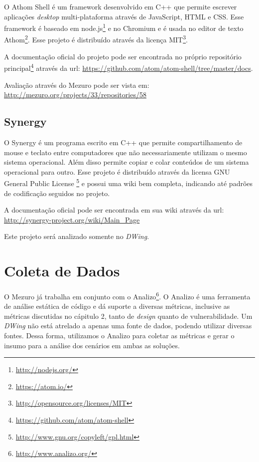 O Athom Shell é um framework desenvolvido em C++ que permite escrever aplicações \emph{desktop} multi-plataforma através de JavaScript, HTML e CSS. Esse framework é baseado em node.js\footnote{\url{http://nodejs.org/}} e no Chromium e é usada no editor de texto Athom\footnote{\url{https://atom.io/}}. Esse projeto é distribuído através da licença MIT\footnote{\url{http://opensource.org/licenses/MIT}}.

A documentação oficial do projeto pode ser encontrada no próprio repositório principal\footnote{\url{https://github.com/atom/atom-shell}} através da url: \url{https://github.com/atom/atom-shell/tree/master/docs}.

Avaliação através do Mezuro pode ser vista em: \url{http://mezuro.org/projects/33/repositories/58}

\subsection{Synergy}
\label{section-synergy}

O Synergy é um programa escrito em C++ que permite compartilhamento de mouse e teclato entre computadores que não necessariamente utilizam o mesmo sistema operacional. Além disso permite copiar e colar conteúdos de um sistema operacional para outro. Esse projeto é distribuído através da licensa GNU General Public License \footnote{\url{http://www.gnu.org/copyleft/gpl.html}} e possui uma wiki bem completa, indicando até padrões de codificação seguidos no projeto.

A documentação oficial pode ser encontrada em sua wiki através da url: \url{http://synergy-project.org/wiki/Main_Page}

Este projeto será analizado somente no \emph{DWing}.

\section{Coleta de Dados}
\label{data-colect}

O Mezuro já trabalha em conjunto com o Analizo\footnote{\url{http://www.analizo.org/}}. O Analizo é uma ferramenta de análise estática de código e dá suporte a diversas métricas, inclusive as métricas discutidas no cápitulo 2, tanto de \emph{design} quanto de vulnerabilidade. Um \emph{DWing} não está atrelado a apenas uma fonte de dados, podendo utilizar diversas fontes. Dessa forma, utilizamos o Analizo para coletar as métricas e gerar o insumo para a análise dos cenários em ambas as soluções.

